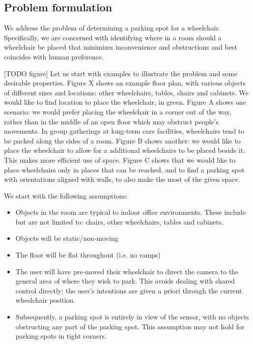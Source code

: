 \subsection{Problem formulation}
We address the problem of determining a parking spot for a wheelchair.
Specifically, we are concerned with identifying where in a room should a
wheelchair be placed that minimizes inconvenience and obstructions and best
coincides with human preference.

[TODO figure]
Let us start with examples to illustrate the problem and some desirable
properties.
Figure X shows an example floor plan, with various objects of different sizes
and locations: other wheelchairs, tables, chairs and cabinets. We would like to
find location to place the wheelchair, in green.  Figure A shows one scenario:
we would prefer placing the wheelchair in a corner out of the way, rather than
in the middle of an open floor which may obstruct people's movements.  In group
gatherings at long-term care facilities, wheelchairs tend to be packed along the
sides of a room.
Figure B
shows another: we would like to place the wheelchair to allow for a additional
wheelchairs to be placed beside it. This makes more efficient use of space.
Figure C shows that we would like to place wheelchairs only in places that can
be reached, and to find a parking spot with orientations aligned with walls, to
also make the most of the given space.

We start with the following assumptions:
\begin{itemize}
\item Objects in the room are typical to indoor office environments. These
include but are not limited to: chairs, other wheelchairs, tables and cabinets.
\item Objects will be static/non-moving
\item The floor will be flat throughout (i.e. no ramps)
\item The user will have pre-moved their wheelchair to direct the camera to the
general area of where they wish to park. This avoids dealing with shared control
directly; the user's intentions are given a priori through the current
wheelchair position.
\item Subsequently, a parking spot is entirely in view of the sensor, with no
objects obstructing any part of the parking spot. This assumption may not hold
for parking spots in tight corners.
\end{itemize}


